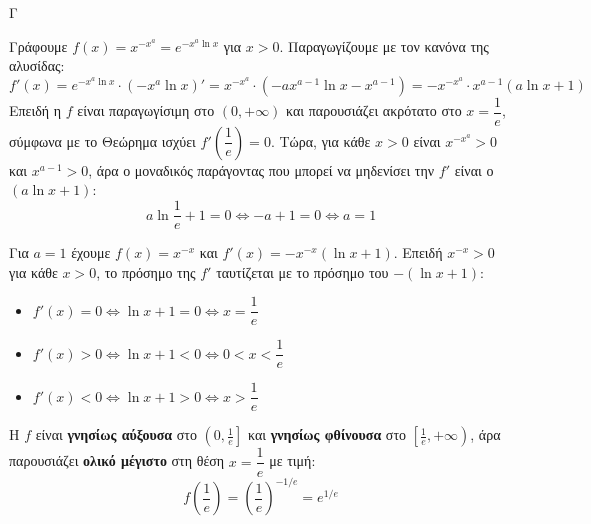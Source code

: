 \begin{thema}{Γ}
\begin{erwthma}
\item Γράφουμε $f(x)=x^{-x^a}=e^{-x^a\ln x}$ για $x>0$. Παραγωγίζουμε με τον κανόνα της αλυσίδας:
\[
f'(x) = e^{-x^a\ln x}\cdot\left(-x^a\ln x\right)' = x^{-x^a}\cdot\left(-ax^{a-1}\ln x - x^{a-1}\right) = -x^{-x^a}\cdot x^{a-1}(a\ln x+1)
\]
Επειδή η $f$ είναι παραγωγίσιμη στο $(0,+\infty)$ και παρουσιάζει ακρότατο στο $x=\dfrac{1}{e}$, σύμφωνα με το Θεώρημα  ισχύει $f'\!\left(\dfrac{1}{e}\right)=0$. Τώρα, για κάθε $x>0$ είναι $x^{-x^a}>0$ και $x^{a-1}>0$, άρα ο μοναδικός παράγοντας που μπορεί να μηδενίσει την $f'$ είναι ο $(a\ln x+1)$:
\[
a\ln\frac{1}{e}+1=0 \Leftrightarrow -a+1=0 \Leftrightarrow a=1
\]

\item Για $a=1$ έχουμε $f(x)=x^{-x}$ και $f'(x)=-x^{-x}(\ln x+1)$. Επειδή $x^{-x}>0$ για κάθε $x>0$, το πρόσημο της $f'$ ταυτίζεται με το πρόσημο του $-(\ln x+1)$:
\begin{itemize}
\item $f'(x)=0\Leftrightarrow \ln x+1=0\Leftrightarrow x=\dfrac{1}{e}$
\item $f'(x)>0\Leftrightarrow \ln x+1<0\Leftrightarrow 0<x<\dfrac{1}{e}$
\item $f'(x)<0\Leftrightarrow \ln x+1>0\Leftrightarrow x>\dfrac{1}{e}$
\end{itemize}
\begin{center}
\end{center}
Η $f$ είναι \textbf{γνησίως αύξουσα} στο $\left(0,\frac{1}{e}\right]$ και \textbf{γνησίως φθίνουσα} στο $\left[\frac{1}{e},+\infty\right)$, άρα παρουσιάζει \textbf{ολικό μέγιστο} στη θέση $x=\dfrac{1}{e}$ με τιμή:
\[f\!\left(\frac{1}{e}\right)=\left(\frac{1}{e}\right)^{-1/e}=e^{1/e}\]


\end{erwthma}
\end{thema}
